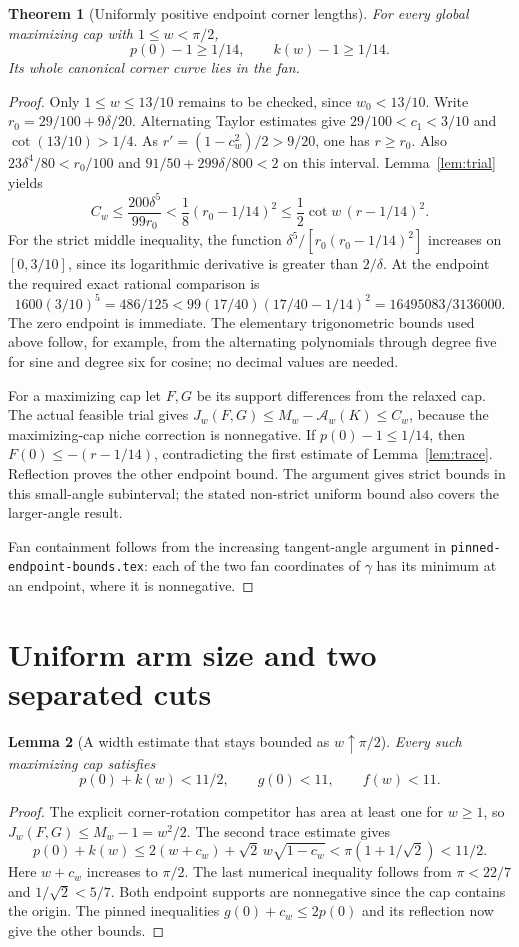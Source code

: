 \documentclass[11pt]{article}
\newtheorem{theorem}{Theorem}[section]
\newtheorem{lemma}[theorem]{Lemma}
\begin{document}
\begin{theorem}[Uniformly positive endpoint corner lengths]\label{thm:endpoints}
For every global maximizing cap with $1\le w<\pi/2$,
\[
 \boxed{p(0)-1\ge1/14,\qquad k(w)-1\ge1/14.}
\]
Its whole canonical corner curve lies in the fan.
\end{theorem}
\begin{proof}
Only $1\le w\le13/10$ remains to be checked, since $w_0<13/10$. Write $r_0=29/100+9\delta/20$. Alternating Taylor estimates give $29/100<c_1<3/10$ and $\cot(13/10)>1/4$. As $r'=(1-c_w^2)/2>9/20$, one has $r\ge r_0$. Also $23\delta^4/80<r_0/100$ and $91/50+299\delta/800<2$ on this interval. Lemma~\ref{lem:trial} yields
\[
 C_w\le\frac{200\delta^5}{99r_0}<\frac18(r_0-1/14)^2\le\frac12\cot w\,(r-1/14)^2.
\]
For the strict middle inequality, the function $\delta^5/[r_0(r_0-1/14)^2]$ increases on $[0,3/10]$, since its logarithmic derivative is greater than $2/\delta$. At the endpoint the required exact rational comparison is
\[
 1600(3/10)^5=486/125
 <99(17/40)(17/40-1/14)^2=16495083/3136000.
\]
The zero endpoint is immediate. The elementary trigonometric bounds used above follow, for example, from the alternating polynomials through degree five for sine and degree six for cosine; no decimal values are needed.

For a maximizing cap let $F,G$ be its support differences from the relaxed cap. The actual feasible trial gives $J_w(F,G)\le M_w-\mathcal A_w(K)\le C_w$, because the maximizing-cap niche correction is nonnegative. If $p(0)-1\le1/14$, then $F(0)\le-(r-1/14)$, contradicting the first estimate of Lemma~\ref{lem:trace}. Reflection proves the other endpoint bound. The argument gives strict bounds in this small-angle subinterval; the stated non-strict uniform bound also covers the larger-angle result.

Fan containment follows from the increasing tangent-angle argument in \texttt{pinned-endpoint-bounds.tex}: each of the two fan coordinates of $\gamma$ has its minimum at an endpoint, where it is nonnegative.
\end{proof}

\section{Uniform arm size and two separated cuts}
\begin{lemma}[A width estimate that stays bounded as $w\uparrow\pi/2$]\label{lem:width}
Every such maximizing cap satisfies
\[
 p(0)+k(w)<11/2,\qquad g(0)<11,\qquad f(w)<11.
\]
\end{lemma}
\begin{proof}
The explicit corner-rotation competitor has area at least one for $w\ge1$, so $J_w(F,G)\le M_w-1=w^2/2$. The second trace estimate gives
\[
 p(0)+k(w)\le2(w+c_w)+\sqrt2\,w\sqrt{1-c_w}
 <\pi(1+1/\sqrt2)<11/2.
\]
Here $w+c_w$ increases to $\pi/2$. The last numerical inequality follows from $\pi<22/7$ and $1/\sqrt2<5/7$. Both endpoint supports are nonnegative since the cap contains the origin. The pinned inequalities $g(0)+c_w\le2p(0)$ and its reflection now give the other bounds.
\end{proof}
\end{document}
